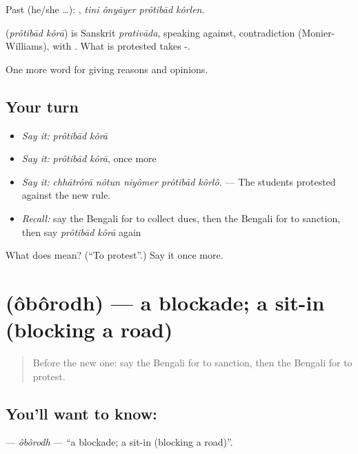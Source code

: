 Past (he/she …):    , \emph{tini ônyāyer prôtibād kôrlen}.

\begin{cousinweb}
\textbf{ } (\emph{prôtibād kôrā}) is Sanskrit \emph{prativāda}, speaking against, contradiction (Monier-Williams), with . What is protested takes -.
\end{cousinweb}

\begin{grammarlens}[title={What you've built}]
One more word for giving reasons and opinions.
\end{grammarlens}

\subsection*{Your turn}
\begin{itemize}
\raggedright
  \item \emph{Say it:} \emph{prôtibād kôrā}
  \item \emph{Say it:} \emph{prôtibād kôrā}, once more
  \item \emph{Say it:} \emph{chhātrôrā nôtun niyômer prôtibād kôrlô.} — The students protested against the new rule.
  \item \emph{Recall:} say the Bengali for to collect dues, then the Bengali for to sanction, then say \emph{prôtibād kôrā} again
\end{itemize}

\begin{tcolorbox}[breakable,colback=teal!4,colframe=teal!35!black,title={Before you move on}]
What does   mean? (\textquotedblleft{}To protest\textquotedblright{}.) Say it once more.
\end{tcolorbox}
\section[\texorpdfstring{\bn{অবরোধ} (ôbôrodh)}{অবরোধ (ôbôrodh)}]{ (ôbôrodh) — a blockade; a sit-in (blocking a road)}

\label{lesson:BN-C349-oborodh}



\begin{quote}
Before the new one: say the Bengali for to sanction, then the Bengali for to protest.
\end{quote}

\subsection*{You'll want to know: }
\textbf{} — \emph{ôbôrodh} — \textquotedblleft{}a blockade; a sit-in (blocking a road)\textquotedblright{}.

